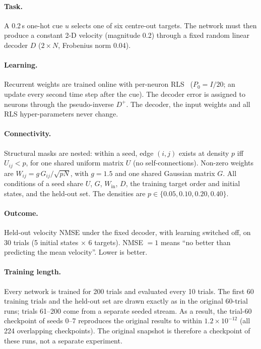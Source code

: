\documentclass[11pt]{article}
\begin{document}
\paragraph{Task.} A 0.2\,s one-hot cue $u$ selects one of six centre-out
targets. The network must then produce a constant 2-D velocity (magnitude 0.2)
through a fixed random linear decoder $D$ ($2\times N$, Frobenius norm 0.04).

\paragraph{Learning.} Recurrent weights are trained online with per-neuron
RLS~\cite{sussillo2009generating} ($P_0=I/20$; an update every second time
step after the cue). The decoder error is assigned to neurons through the
pseudo-inverse $D^{+}$. The decoder, the input weights and all RLS
hyper-parameters never change.

\paragraph{Connectivity.} Structural masks are nested: within a seed, edge
$(i,j)$ exists at density $p$ iff $U_{ij}<p$, for one shared uniform matrix
$U$ (no self-connections). Non-zero weights are $W_{ij}=g\,G_{ij}/\sqrt{pN}$,
with $g=1.5$ and one shared Gaussian matrix $G$. All conditions of a seed share
$U$, $G$, $W_{\text{in}}$, $D$, the training target order and initial states,
and the held-out set. The densities are $p\in\{0.05,0.10,0.20,0.40\}$.

\paragraph{Outcome.} Held-out velocity NMSE under the fixed decoder, with
learning switched off, on 30 trials (5 initial states $\times$ 6 targets).
NMSE $=1$ means ``no better than predicting the mean velocity''. Lower is
better.

\paragraph{Training length.} Every network is trained for 200 trials and
evaluated every 10 trials. The first 60 training trials and the held-out set
are drawn exactly as in the original 60-trial runs; trials 61--200 come from a
separate seeded stream. As a result, the trial-60 checkpoint of seeds 0--7
reproduces the original results to within $1.2\times10^{-12}$ (all 224
overlapping checkpoints). The original snapshot is therefore a checkpoint of
these runs, not a separate experiment.
\end{document}
